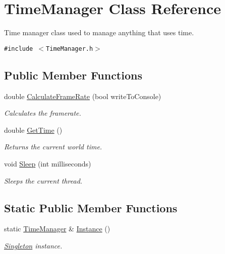\hypertarget{class_time_manager}{
\section{TimeManager Class Reference}
\label{class_time_manager}
}
Time manager class used to manage anything that uses time.  


{\tt \#include $<$TimeManager.h$>$}

\subsection*{Public Member Functions}
\begin{CompactItemize}
\item 
double \hyperlink{class_time_manager_95782501e884a42904e2e726246701d5}{CalculateFrameRate} (bool writeToConsole)
\begin{CompactList}\small\item\em Calculates the framerate. \item\end{CompactList}\item 
double \hyperlink{class_time_manager_7ba98f4d4ea9a0519007d127a460b259}{GetTime} ()
\begin{CompactList}\small\item\em Returns the current world time. \item\end{CompactList}\item 
void \hyperlink{class_time_manager_a2273e7e9e31462ae81b2331fe8e7ac6}{Sleep} (int milliseconds)
\begin{CompactList}\small\item\em Sleeps the current thread. \item\end{CompactList}\end{CompactItemize}
\subsection*{Static Public Member Functions}
\begin{CompactItemize}
\item 
static \hyperlink{class_time_manager}{TimeManager} \& \hyperlink{class_time_manager_9bb9e5390526b32783b94adb728604fa}{Instance} ()
\begin{CompactList}\small\item\em \hyperlink{class_singleton}{Singleton} instance. \item\end{CompactList}\end{CompactItemize}
